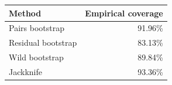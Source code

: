 \begin{tabular}{lr}
\toprule
Method & Empirical coverage \\
\midrule
Pairs bootstrap & 91.96\% \\
Residual bootstrap & 83.13\% \\
Wild bootstrap & 89.84\% \\
Jackknife & 93.36\% \\
\bottomrule
\end{tabular}
